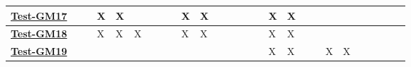 \documentclass[12pt, titlepage]{article}
\begin{document}
\begin{landscape}
\begin{table}[H]
\begin{adjustwidth}{-0.0in}{-1in}
{\begin{tabular}{l|l|l|l|l|l|l|l|l|l|l|l|l|l|l|l|l|l|l|l|l|l|l|l|l|l|l|}
\multicolumn{1}{|l|}{\hyperref[Test-GM17]{\textbf{Test-GM17}}}&              &              & X            & X            &              &              &              &              & X            & X             &               &               &               &               &               & X             & X             &               &               &               &               &               &             &             &             &             \\ \hline
\multicolumn{1}{|l|}{\hyperref[Test-GM18]{\textbf{Test-GM18}}} &              &              & X            & X            & X            &              &              &              & X            & X             &               &               &               &               &               & X             & X             &               &               &               &               &               &             &             &             &             \\ \hline
\multicolumn{1}{|l|}{\hyperref[Test-GM19]{\textbf{Test-GM19}}} &              &              &              &              &              &              &              &              &              &               &               &               &               &               &               & X             & X             &               &               & X             & X             &               &             &             &             &             \\ \hline


\end{tabular}}
\end{adjustwidth}
\end{table}
\end{landscape}
\end{document}
